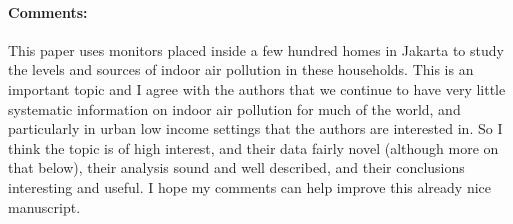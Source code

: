 \documentclass[12pt,english]{article}
\begin{document}
\paragraph{Comments:}
This paper uses monitors placed inside a few hundred homes in Jakarta to study the levels and sources of indoor air pollution in these households. This is an important topic and I agree with the authors that we continue to have very little systematic information on indoor air pollution for much of the world, and particularly in urban low income settings that the authors are interested in. So I think the topic is of high interest, and their data fairly novel (although more on that below), their analysis sound and well described, and their conclusions interesting and useful. I hope my comments can help improve this already nice manuscript.
\end{document}
